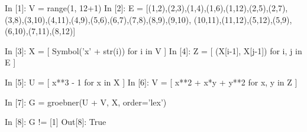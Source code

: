 \begin{python}
In [1]: V = range(1, 12+1)
In [2]: E = [(1,2),(2,3),(1,4),(1,6),(1,12),(2,5),(2,7),
(3,8),(3,10),(4,11),(4,9),(5,6),(6,7),(7,8),(8,9),(9,10),
(10,11),(11,12),(5,12),(5,9),(6,10),(7,11),(8,12)]

In [3]: X = [ Symbol('x' + str(i)) for i in V ]
In [4]: Z = [ (X[i-1], X[j-1]) for i, j in E ]

In [5]: U = [ x**3 - 1 for x in X ]
In [6]: V = [ x**2 + x*y + y**2 for x, y in Z ]

In [7]: G = groebner(U + V, X, order='lex')

In [8]: G != [1]
Out[8]: True
\end{python}

